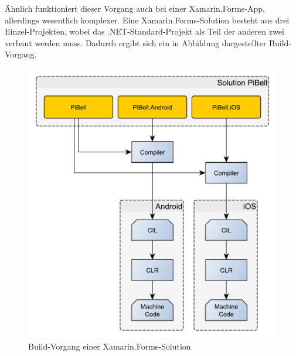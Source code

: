 Ähnlich funktioniert dieser Vorgang auch bei einer Xamarin.Forms-App, allerdings wesentlich komplexer.
Eine Xamarin.Forms-Solution besteht aus drei Einzel-Projekten, wobei das .NET-Standard-Projekt als Teil der anderen zwei verbaut werden muss.
Dadurch ergibt sich ein in Abbildung  dargestellter Build-Vorgang.
\begin{figure}
    \centering\includegraphics[width=0.9\linewidth]{images/auswahl_rahmenwerk/build-vorgang.pdf}
    \caption{Build-Vorgang einer Xamarin.Forms-Solution}
    \label{fig:build-forms}
\end{figure}

